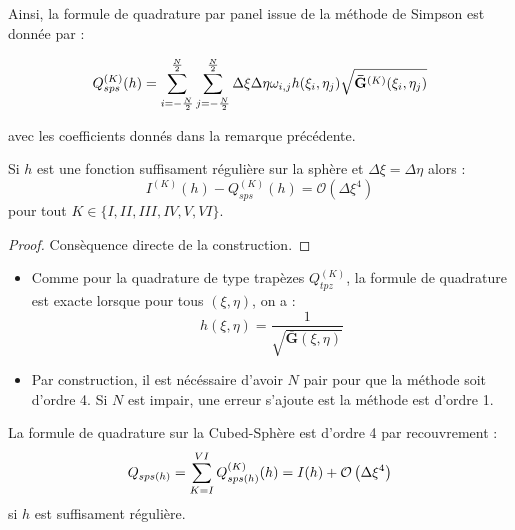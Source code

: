 Ainsi, la formule de quadrature par panel issue de la méthode de Simpson est donnée par :

\begin{equation}
Q_{sps}^{(K)}(h)=\displaystyle\sum\limits_{i = -\frac{N}{2}}^{\frac{N}{2}}\displaystyle\sum\limits_{j = -\frac{N}{2}}^{\frac{N}{2}} \Delta \xi \Delta \eta \omega_{i,j} h(\xi_i, \eta_j) \sqrt{\mathbf{\bar{G}}^{(K)}(\xi_i, \eta_j)}
\label{eq:simpson par panel}
\end{equation}

avec les coefficients donnés dans la remarque précédente.

\begin{proposition}
Si $h$ est une fonction suffisament régulière sur la sphère et $\Delta \xi = \Delta \eta$ alors :
\begin{equation}
I^{(K)}(h) - Q^{(K)}_{sps}(h) = \mathcal{O} \left( \Delta \xi^4 \right)
\end{equation}
pour tout $K \in \lbrace I, II, III, IV, V, VI \rbrace$.
\label{prop:consistance sps panel}
\end{proposition}

\begin{proof}
Consèquence directe de la construction.
\end{proof}

\begin{remarque}
\begin{itemize}
\item Comme pour la quadrature de type trapèzes $Q_{tpz}^{(K)}$, la formule de quadrature est exacte lorsque pour tous $(\xi,\eta)$, on a :
\begin{equation}
h(\xi,\eta)=\dfrac{1}{\sqrt{\overline{\mathbf{G}}(\xi,\eta)}}
\end{equation}
\item Par construction, il est nécéssaire d'avoir $N$ pair pour que la méthode soit d'ordre 4. Si $N$ est impair, une erreur s'ajoute est la méthode est d'ordre 1.
\end{itemize}
\end{remarque}

\begin{corollaire}
La formule de quadrature sur la Cubed-Sphère est d'ordre 4 par recouvrement :
\begin{equation}
Q_{sps(h)}=\displaystyle\sum\limits_{K=I}^{VI} Q_{sps(h)}^{(K)}(h) = I(h) + \mathcal{O} \left( \Delta \xi^4 \right)
\end{equation}
si $h$ est suffisament régulière.
\end{corollaire}


